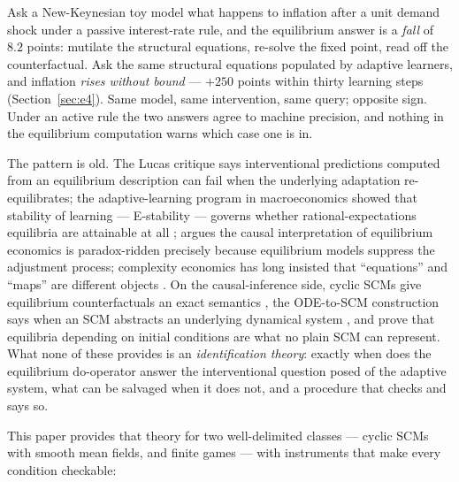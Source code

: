 \documentclass[pmlr]{jmlr}
\newcommand{\doop}{\mathrm{do}}
\begin{document}
Ask a New-Keynesian toy model what happens to inflation after a unit demand shock under a passive
interest-rate rule, and the equilibrium answer is a \emph{fall} of $8.2$ points: mutilate the
structural equations, re-solve the fixed point, read off the counterfactual. Ask the same
structural equations populated by adaptive learners, and inflation \emph{rises without bound} ---
$+250$ points within thirty learning steps (Section~\ref{sec:e4}). Same model, same intervention,
same query; opposite sign. Under an active rule the two answers agree to machine precision, and
nothing in the equilibrium computation warns which case one is in.

The pattern is old. The Lucas critique \citep{lucas1976econometric} says interventional
predictions computed from an equilibrium description can fail when the underlying adaptation
re-equilibrates; the adaptive-learning program in macroeconomics showed that stability of
learning --- E-stability --- governs whether rational-expectations equilibria are attainable at
all \citep{marcet1989convergence,evans2001learning}; \citet{dogra2024paradoxes} argues the causal
interpretation of equilibrium economics is paradox-ridden precisely because equilibrium models
suppress the adjustment process; complexity economics has long insisted that ``equations'' and
``maps'' are different objects \citep{brock1997rational,pangallo2019best}. On the
causal-inference side, cyclic SCMs give equilibrium counterfactuals an exact semantics
\citep{bongers2021foundations}, the ODE-to-SCM construction says when an SCM abstracts an
underlying dynamical system \citep{mooij2013ordinary,rubenstein2017causal}, and
\citet{blom2019beyond} prove that equilibria depending on initial conditions are what no plain
SCM can represent. What none of these provides is an \emph{identification theory}: exactly when
does the equilibrium $\doop$-operator answer the interventional question posed of the adaptive
system, what can be salvaged when it does not, and a procedure that checks and says so.

This paper provides that theory for two well-delimited classes --- cyclic SCMs with smooth mean
fields, and finite games --- with instruments that make every condition checkable:
\end{document}
